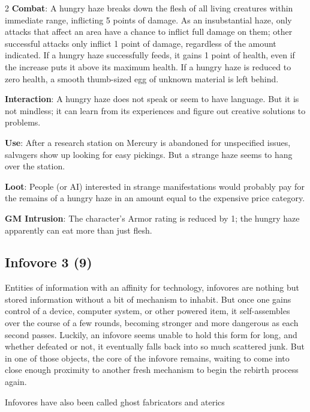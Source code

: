 \begin{multicols}{2}
\textbf{Combat}: A hungry haze breaks down the flesh of all living creatures within immediate range, inflicting 5 points of damage. As an insubstantial haze, only attacks that affect an area have a chance to inflict full damage on them; other successful attacks only inflict 1 point of damage, regardless of the amount indicated. If a hungry haze successfully feeds, it gains 1 point of health, even if the increase puts it above its maximum health. If a hungry haze is reduced to zero health, a smooth thumb-sized egg of unknown material is left behind. 

\textbf{Interaction}: A hungry haze does not speak or seem to have language. But it is not mindless; it can learn from its experiences and figure out creative solutions to problems. 

\textbf{Use}: After a research station on Mercury is abandoned for unspecified issues, salvagers show up looking for easy pickings. But a strange haze seems to hang over the station. 

\textbf{Loot}: People (or AI) interested in strange manifestations would probably pay for the remains of a hungry haze in an amount equal to the expensive price category.

\textbf{GM Intrusion}: The character’s Armor rating is reduced by 1; the hungry haze apparently can eat more than just flesh.


\subsection{Infovore 3 (9)}

Entities of information with an affinity for technology, infovores are nothing but stored information without a bit of mechanism to inhabit. But once one gains control of a device, computer system, or other powered item, it self-assembles over the course of a few rounds, becoming stronger and more dangerous as each second passes. Luckily, an infovore seems unable to hold this form for long, and whether defeated or not, it eventually falls back into so much scattered junk. But in one of those objects, the core of the infovore remains, waiting to come into close enough proximity to another fresh mechanism to begin the rebirth process again. 

Infovores have also been called ghost fabricators and aterics


\end{multicols}
